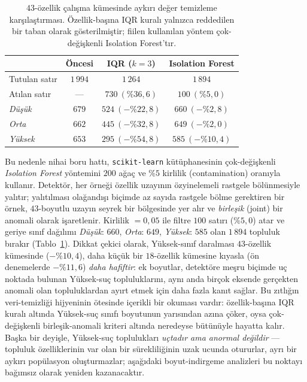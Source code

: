 \documentclass{ieeeaccess}
\begin{document}
\begin{table}[!t]
\caption{$43$-özellik çalışma kümesinde aykırı değer temizleme karşılaştırması. Özellik-başına IQR kuralı yalnızca reddedilen bir taban olarak gösterilmiştir; fiilen kullanılan yöntem çok-değişkenli Isolation Forest'tır.}
\label{tab:outlier}
\centering
\small
\begin{tabular}{lccc}
\toprule
 & Öncesi & IQR ($k=3$) & Isolation Forest \\
\midrule
Tutulan satır        & $1\,994$ & $1\,264$ & $1\,894$ \\
Atılan satır         & ---      & $730\ (\%36{,}6)$ & $100\ (\%5{,}0)$ \\
\midrule
\emph{Düşük}         & $679$ & $524\ (-\%22{,}8)$ & $660\ (-\%2{,}8)$ \\
\emph{Orta}          & $662$ & $445\ (-\%32{,}8)$ & $649\ (-\%2{,}0)$ \\
\emph{Yüksek}        & $653$ & $295\ (-\%54{,}8)$ & $585\ (-\%10{,}4)$ \\
\bottomrule
\end{tabular}
\end{table}

Bu nedenle nihai boru hattı, \texttt{scikit-learn} \cite{pedregosa} kütüphanesinin çok-değişkenli \emph{Isolation Forest} \cite{liu2008isolation} yöntemini $200$ ağaç ve $\%5$ kirlilik (contamination) oranıyla kullanır. Detektör, her örneği özellik uzayının özyinelemeli rastgele bölünmesiyle yalıtır; yalıtılması olağandışı biçimde az sayıda rastgele bölme gerektiren bir örnek, $43$-boyutlu uzayın seyrek bir bölgesinde yer alır ve \emph{birleşik} (joint) bir anomali olarak işaretlenir. Kirlilik $=0{,}05$ ile filtre $100$ satırı ($\%5{,}0$) atar ve geriye sınıf dağılımı \emph{Düşük}: $660$, \emph{Orta}: $649$, \emph{Yüksek}: $585$ olan $1\,894$ topluluk bırakır (Tablo~\ref{tab:outlier}). Dikkat çekici olarak, Yüksek-sınıf daralması $43$-özellik kümesinde ($-\%10{,}4$), daha küçük bir $18$-özellik kümesine kıyasla (ön denemelerde $-\%11{,}6$) \emph{daha hafiftir}: ek boyutlar, detektöre meşru biçimde uç noktada bulunan Yüksek-suç topluluklarını, aynı anda birçok eksende gerçekten anomali olan topluluklardan ayırt etmek için daha fazla kanıt sağlar. Bu zıtlığın veri-temizliği hijyeninin ötesinde içerikli bir okuması vardır: özellik-başına IQR kuralı altında Yüksek-suç sınıfı boyutunun yarısından azına çöker, oysa çok-değişkenli birleşik-anomali kriteri altında neredeyse bütünüyle hayatta kalır. Başka bir deyişle, Yüksek-suç toplulukları \emph{uçtadır ama anormal değildir} --- topluluk özelliklerinin var olan bir sürekliliğinin uzak ucunda otururlar, ayrı bir aykırı popülasyon oluşturmazlar; aşağıdaki boyut-indirgeme analizleri bu noktayı bağımsız olarak yeniden kazanacaktır.
\end{document}
